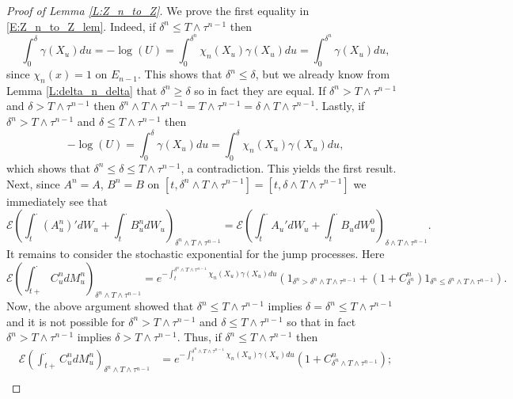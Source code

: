 \documentclass[11pt, letterpaper]{amsart}
\theoremstyle{definition}
\theoremstyle{remark}
\numberwithin{equation}{section}
\newcommand{\EN}{\mathcal{E}}
\begin{document}
\begin{proof}[Proof of Lemma \ref{L:Z_n_to_Z}]

We prove the first equality in \eqref{E:Z_n_to_Z_lem}.  Indeed, if $\delta^n\leq T\wedge\tau^{n-1}$ then
\begin{equation*}
\int_0^{\delta}\gamma(X_u)du = -\log(U) = \int_0^{\delta^n}\chi_n(X_u)\gamma(X_u)du = \int_0^{\delta^n} \gamma(X_u)du,
\end{equation*}
since $\chi_n(x) = 1$ on $E_{n-1}$. This shows that $\delta^n\leq \delta$, but we already know from Lemma \ref{L:delta_n_delta} that $\delta^n\geq \delta$ so in fact they are equal. If $\delta^n > T\wedge\tau^{n-1}$ and $\delta> T\wedge\tau^{n-1}$ then $\delta^n\wedge T\wedge\tau^{n-1} = T\wedge \tau^{n-1} = \delta\wedge T\wedge \tau^{n-1}$.  Lastly, if $\delta^n > T\wedge\tau^{n-1}$ and $\delta \leq  T\wedge\tau^{n-1}$ then
\begin{equation*}
-\log(U) = \int_0^\delta \gamma(X_u)du = \int_0^{\delta}\chi_n(X_u)\gamma(X_u)du,
\end{equation*}
which shows that $\delta^n\leq \delta \leq T\wedge\tau^{n-1}$, a contradiction.  This yields the first result. Next, since $A^n=A$, $B^n=B$ on $[t,\delta^n\wedge T\wedge\tau^{n-1}] = [t,\delta\wedge T\wedge\tau^{n-1}]$ we immediately see that
\begin{equation*}
\EN\left(\int_t^\cdot (A^n_u)'dW_u + \int_t^{\cdot}B^n_udW_u\right)_{\delta^n\wedge T\wedge\tau^{n-1}} = \EN\left(\int_t^\cdot A_u'dW_u + \int_t^\cdot B_udW^0_u\right)_{\delta\wedge T\wedge\tau^{n-1}}.
\end{equation*}
It remains to consider the stochastic exponential for the jump processes.  Here
\begin{equation*}
\EN\left(\int_{t+}^\cdot C^n_u dM^n_u\right)_{\delta^n\wedge T\wedge \tau^{n-1}} = e^{-\int_t^{\delta^n\wedge T\wedge \tau^{n-1}}\chi_n(X_u)\gamma(X_u)du}\left(1_{\delta^n > \delta^n\wedge T\wedge \tau^{n-1}} + (1+C^n_{\delta^n})1_{\delta^n\leq \delta^n\wedge T\wedge\tau^{n-1}}\right).
\end{equation*}
Now, the above argument showed that $\delta^n\leq T\wedge\tau^{n-1}$ implies $\delta = \delta^n\leq T\wedge\tau^{n-1}$ and it is not possible for $\delta^n > T\wedge\tau^{n-1}$ and $\delta\leq T\wedge\tau^{n-1}$ so that in fact $\delta^n>T\wedge\tau^{n-1}$ implies $\delta>T\wedge\tau^{n-1}$. Thus, if $\delta^n \leq T\wedge\tau^{n-1}$ then
\begin{equation*}
\begin{split}
\EN\left(\int_{t+}^\cdot C^n_u dM^n_u\right)_{\delta^n\wedge T\wedge \tau^{n-1}} & = e^{-\int_t^{\delta^n\wedge T\wedge\tau^{n-1}}\chi_n(X_u)\gamma(X_u)du}\left(1+C^n_{\delta^n\wedge T\wedge\tau^{n-1}}\right);\\

\end{split}
\end{equation*}
\end{proof}
\end{document}
